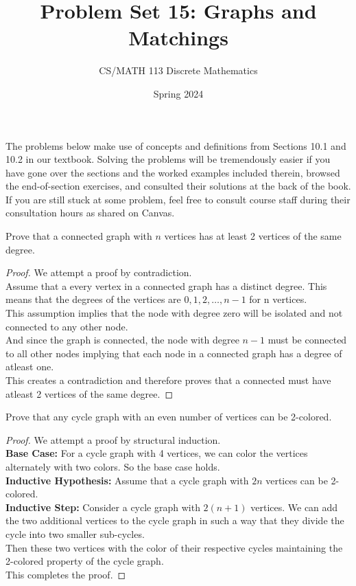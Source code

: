 \documentclass[a4paper]{exam}
\title{Problem Set 15: Graphs and Matchings}
\author{CS/MATH 113 Discrete Mathematics}
\date{Spring 2024}
\begin{document}
\maketitle

The problems below make use of concepts and definitions from Sections 10.1 and 10.2 in our textbook. Solving the problems will be tremendously easier if you have gone over the sections and the worked examples included therein, browsed the end-of-section exercises, and consulted their solutions at the back of the book. If you are still stuck at some problem, feel free to consult course staff during their consultation hours as shared on Canvas.

\begin{questions}
  
  \question Prove that a connected graph with $n$ vertices has at least 2 vertices of the same degree.
  \begin{solution}
    \renewcommand\qedsymbol{$\square$}
    \begin{proof}
      We attempt a proof by contradiction. \\
      Assume that a every vertex in a connected graph has a distinct degree. This means that the degrees of the vertices are $0, 1, 2, \ldots, n-1$ for n vertices. \\
      This assumption implies that the node with degree zero will be isolated and not connected to any other node. \\
      And since the graph is connected, the node with degree $n-1$ must be connected to all other nodes implying that each node in a connected graph has a degree of atleast one. \\
      This creates a contradiction and therefore proves that a connected must have atleast 2 vertices of the same degree.
    \end{proof}
  \end{solution}

  \question Prove that any cycle graph with an even number of vertices can be 2-colored.
  \begin{solution}
    \renewcommand\qedsymbol{$\square$}
    \begin{proof}
      We attempt a proof by structural induction. \\
      \textbf{Base Case:} For a cycle graph with 4 vertices, we can color the vertices alternately with two colors. So the base case holds. \\
      \textbf{Inductive Hypothesis:} Assume that a cycle graph with $2n$ vertices can be 2-colored. \\
      \textbf{Inductive Step:} Consider a cycle graph with $2(n+1)$ vertices. We can add the two additional vertices to the cycle graph in such a way that they divide the cycle into two smaller sub-cycles. \\
      Then these two vertices with the color of their respective cycles maintaining the 2-colored property of the cycle graph. \\
      This completes the proof.
    \end{proof}
  \end{solution}


\end{questions}
\end{document}
